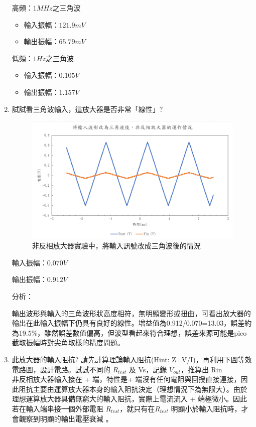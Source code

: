 \documentclass[12pt,a4paper]{article}
\begin{document}
\begin{CJK}{UTF8}{bkai}
\begin{enumerate}
高頻：$1MHz$之三角波
\begin{itemize}
    \item 輸入振幅：$121.9mV$
    \item 輸出振幅：$65.79mV$
\end{itemize}

低頻：$1Hz$之三角波
\begin{itemize}
    \item 輸入振幅：$0.105V$
    \item 輸出振幅：$1.157V$
\end{itemize}


\item 試試看三角波輸入，這放大器是否非常「線性」?

\begin{figure}[h]
    \centering
    \includegraphics[width=0.7\linewidth]{figures/non-ia/non-inverting amplifier_tri.png}
    \caption{非反相放大器實驗中，將輸入訊號改成三角波後的情況}
    \label{fig:non_IA_tri}
\end{figure}

輸入振幅：$0.070V$

輸出振幅：$0.912V$

\noindent 分析：

輸出波形與輸入的三角波形狀高度相符，無明顯變形或扭曲，可看出放大器的輸出在此輸入振幅下仍具有良好的線性。增益值為0.912/0.070=13.03，誤差約為19.5\%，雖然誤差數值偏高，但波型看起來符合理想，誤差來源可能是pico截取振幅時對尖角取樣的精度問題。

\item 此放大器的輸入阻抗? 請先計算理論輸入阻抗(Hint: Z=V/I)，再利用下圖等效電路圖，設計電路。試試不同的 $R_{test}$ 及 Vs，記錄 $V_{out}$，推算出 Rin\\
非反相放大器輸入接在 + 端，特性是+ 端沒有任何電阻與回授直接連接，因此阻抗主要由運算放大器本身的輸入阻抗決定（理想情況下為無限大）。由於理想運算放大器具備無窮大的輸入阻抗，實際上電流流入 + 端極微小。因此若在輸入端串接一個外部電阻 $R_{test}$，就只有在$R_{test}$ 明顯小於輸入阻抗時，才會觀察到明顯的輸出電壓衰減 。


\end{enumerate}
\end{CJK}
\end{document}
